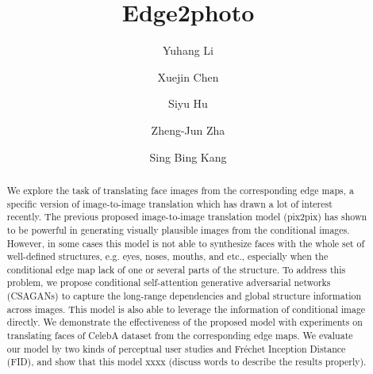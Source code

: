 \documentclass[format=acmsmall, review=false, screen=true]{acmart}
\begin{document}
\title[Edge2photo]{Edge2photo}

\author{Yuhang Li}
%
%
\author{Xuejin Chen}
%
%
\author{Siyu Hu}
%
%
\author{Zheng-Jun Zha}
%
%
\author{Sing Bing Kang}

\begin{abstract}
We explore the task of translating face images from the corresponding edge maps, a specific version of image-to-image translation which has drawn a lot of interest recently. 
The previous proposed image-to-image translation model (pix2pix) has shown to be powerful in generating visually plausible images from the conditional images.
However, in some cases this model is not able to synthesize faces with the whole set of well-defined structures, e.g. eyes, noses, mouths, and etc., especially when the conditional edge map lack of one or several parts of the structure. 
To address this problem, we propose conditional self-attention generative adversarial networks (CSAGANs) to capture the long-range dependencies and global structure information across images. This model is also able to leverage the information of conditional image directly. We demonstrate the effectiveness of the proposed model with experiments on translating faces of CelebA dataset from the corresponding edge maps. We evaluate our model by two kinds of perceptual user studies and Fr\'echet Inception Distance (FID), and show that this model xxxx (discuss words to describe the results properly).
\end{abstract}
\end{document}
